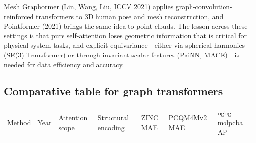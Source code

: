 Mesh Graphormer (Lin, Wang, Liu, ICCV 2021) applies graph-convolution-reinforced transformers to 3D human pose and mesh reconstruction, and Pointformer (2021) brings the same idea to point clouds. The lesson across these settings is that pure self-attention loses geometric information that is critical for physical-system tasks, and explicit equivariance---either via spherical harmonics (SE(3)-Transformer) or through invariant scalar features (PaiNN, MACE)---is needed for data efficiency and accuracy.

\subsection{Comparative table for graph transformers}\label{comparative-table-for-graph-transformers}

{\def\LTcaptype{none} %
\begin{longtable}[]{@{}
  >{\raggedright\arraybackslash}p{}
  >{\raggedright\arraybackslash}p{}
  >{\raggedright\arraybackslash}p{}
  >{\raggedright\arraybackslash}p{}
  >{\raggedright\arraybackslash}p{}
  >{\raggedright\arraybackslash}p{}
  >{\raggedright\arraybackslash}p{}@{}}
\toprule\noalign{}
\begin{minipage}[b]{\linewidth}\raggedright
Method
\end{minipage} & \begin{minipage}[b]{\linewidth}\raggedright
Year
\end{minipage} & \begin{minipage}[b]{\linewidth}\raggedright
Attention scope
\end{minipage} & \begin{minipage}[b]{\linewidth}\raggedright
Structural encoding
\end{minipage} & \begin{minipage}[b]{\linewidth}\raggedright
ZINC MAE
\end{minipage} & \begin{minipage}[b]{\linewidth}\raggedright
PCQM4Mv2 MAE
\end{minipage} & \begin{minipage}[b]{\linewidth}\raggedright
ogbg-molpcba AP
\end{minipage} \\

\end{longtable}}
